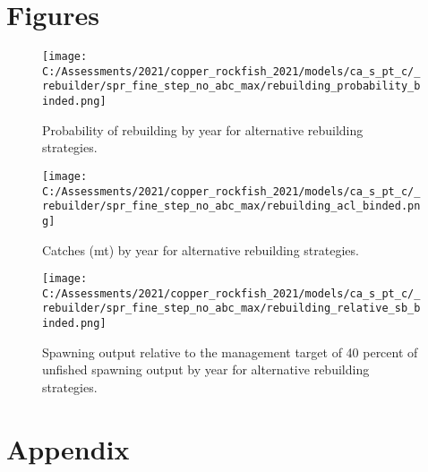 \documentclass[11pt,
  english,
  a4paper,
]{article}
\begin{document}
\clearpage

\clearpage


\hypertarget{figures}{%
\section{Figures}\label{figures}}

\leavevmode\tagmcend\tagstructend


\begin{figure}
\centering
\texttt{[image: C:/Assessments/2021/copper\_rockfish\_2021/models/ca\_s\_pt\_c/\_rebuilder/spr\_fine\_step\_no\_abc\_max/rebuilding\_probability\_binded.png]}
\caption{Probability of rebuilding by year for alternative rebuilding strategies.\label{fig:prob-fig}}
\end{figure}

\tagmcend\tagstructend


\begin{figure}
\centering
\texttt{[image: C:/Assessments/2021/copper\_rockfish\_2021/models/ca\_s\_pt\_c/\_rebuilder/spr\_fine\_step\_no\_abc\_max/rebuilding\_acl\_binded.png]}
\caption{Catches (mt) by year for alternative rebuilding strategies.\label{fig:acl-fig}}
\end{figure}

\tagmcend\tagstructend


\begin{figure}
\centering
\texttt{[image: C:/Assessments/2021/copper\_rockfish\_2021/models/ca\_s\_pt\_c/\_rebuilder/spr\_fine\_step\_no\_abc\_max/rebuilding\_relative\_sb\_binded.png]}
\caption{Spawning output relative to the management target of 40 percent of unfished spawning output by year for alternative rebuilding strategies.\label{fig:rel-ssb-fig}}
\end{figure}

\tagmcend\tagstructend

\clearpage


\hypertarget{appendix}{%
\section{Appendix}\label{appendix}}
\end{document}

